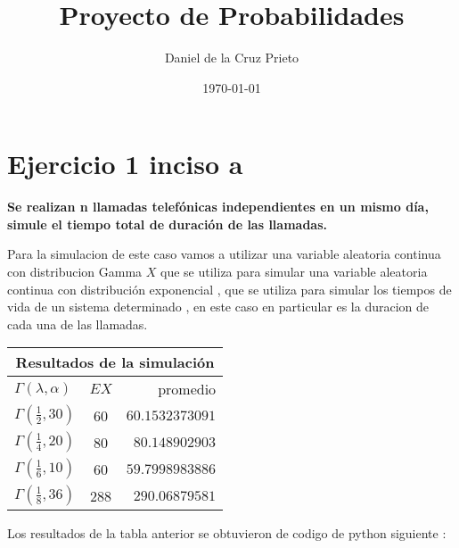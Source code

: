 \documentclass{article}
\begin{document}
    \title{Proyecto de Probabilidades} 
	\author{Daniel de la Cruz Prieto}
	\date{\today}    
    \maketitle
    


    \section*{Ejercicio 1 inciso a}

    \begin{flushleft}
        {\bf Se realizan n llamadas telef\'onicas independientes en un mismo d\'ia, simule
        el tiempo total de duraci\'on de las llamadas.}

        Para la simulacion de este caso vamos a utilizar una variable aleatoria continua con 
        distribucion Gamma $X  $ que se utiliza para simular una variable aleatoria continua con 
        distribuci\'on exponencial , que se utiliza para simular los tiempos de vida de un 
        sistema determinado , en este caso en particular es la duracion de cada una de las llamadas. 

        \begin{center}
            \begin{tabular}{|l|c|r|}
                \hline
                \multicolumn{3}{|c|}{Resultados de la simulaci\'on}\\
                \hline
                \hline
                $\varGamma \left(\lambda , \alpha\right) $ & $EX$ & promedio \\
                \hline
                $\varGamma \left(\frac{1}{2} , 30\right) $ & 60& $60.1532373091$  \\
                \hline 
                $\varGamma \left(\frac{1}{4} , 20\right) $ & 80& $80.148902903$  \\
                \hline
                $\varGamma \left(\frac{1}{6} , 10\right) $ & 60& $59.7998983886$ \\
                \hline
                $\varGamma \left(\frac{1}{8} , 36\right) $ & 288 & $290.06879581$  \\
                \hline
            \end{tabular}
        \end{center}

        Los resultados de la tabla anterior se obtuvieron de codigo de python siguiente : 


\end{flushleft}
\end{document}
